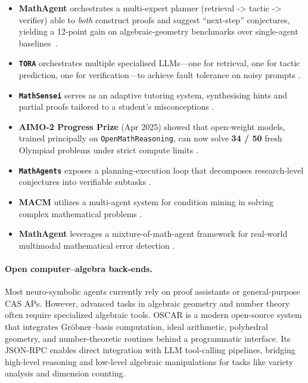 \documentclass[acmsmall,anonymous]{acmart}
\begin{document}
\begin{itemize}
    \item \textbf{MathAgent} orchestrates a multi-expert planner
(retrieval -> tactic -> verifier) able to \emph{both} construct proofs and
suggest “next-step” conjectures, yielding a 12-point gain on
algebraic-geometry benchmarks over single-agent
baselines~\cite{yan2025mathagent}.    
    \item \textbf{\texttt{TORA}} orchestrates multiple specialised LLMs—one for retrieval, one for tactic prediction, one for verification—to achieve fault tolerance on noisy prompts \cite{gou2024tora}.  
    \item \textbf{\texttt{MathSensei}} serves as an adaptive tutoring system, synthesising hints and partial proofs tailored to a student’s misconceptions \cite{sun2024mathsensei}.  
    \item \textbf{AIMO-2 Progress Prize} (Apr 2025) showed that
    open-weight models, trained principally on
    \texttt{OpenMathReasoning}, can now solve \textbf{34 / 50} fresh
    Olympiad problems under strict compute limits
    \cite{Moshkov2025OpenMath}.
    \item \textbf{\texttt{MathAgents}} exposes a planning-execution loop that decomposes research-level conjectures into verifiable subtasks \cite{jones2024mathagents}. 
    \item \textbf{MACM} utilizes a multi-agent system for condition mining in solving complex mathematical problems \cite{lei2024}.
    \item \textbf{MathAgent} leverages a mixture-of-math-agent framework for real-world multimodal mathematical error detection \cite{yan2025b}.
\end{itemize}

\paragraph{Open computer–algebra back-ends.}
Most neuro-symbolic agents currently rely on proof assistants or general-purpose CAS APs. However, advanced tasks in algebraic geometry and number theory often require specialized algebraic tools.
\textsc{OSCAR} \cite{bosma2021oscar} is a modern open-source system that integrates Gröbner–basis computation, ideal arithmetic, polyhedral
geometry, and number-theoretic routines behind a programmatic interface.
Its JSON-RPC enables direct integration with LLM tool-calling pipelines, bridging high-level reasoning and low-level algebraic manipulations for tasks like variety analysis and dimension counting.
\end{document}
